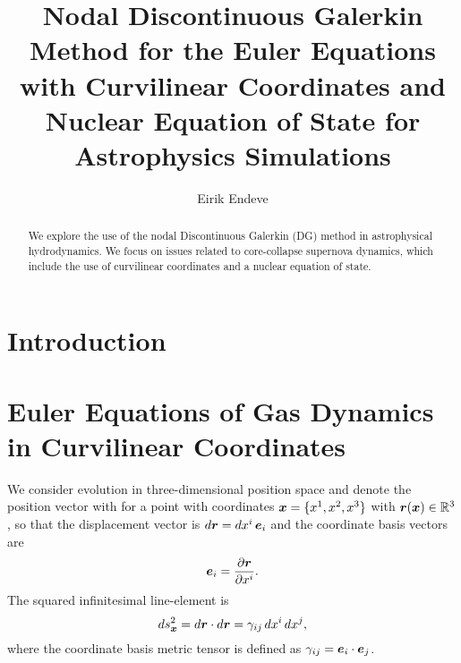 \documentclass[10pt,preprint]{aastex}
\begin{document}
\title{Nodal Discontinuous Galerkin Method for the Euler Equations with Curvilinear Coordinates and Nuclear Equation of State for Astrophysics Simulations}
\author{Eirik Endeve}

\begin{abstract}
We explore the use of the nodal Discontinuous Galerkin (DG) method in astrophysical hydrodynamics.  
We focus on issues related to core-collapse supernova dynamics, which include the use of curvilinear coordinates and a nuclear equation of state.  
\end{abstract}

\section{Introduction}

\section{Euler Equations of Gas Dynamics in Curvilinear Coordinates}

We consider evolution in three-dimensional position space and denote the position vector with for a point with coordinates $\boldsymbol{x}=\{x^{1},x^{2},x^{3}\}$ with $\boldsymbol{r}(\boldsymbol{x})\in\mathbb{R}^{3}$, so that the displacement vector is $d\boldsymbol{r}=dx^{i}\,\boldsymbol{e}_{i}$ and the coordinate basis vectors are
\begin{equation}
  \boldsymbol{e}_{i}=\frac{\partial \boldsymbol{r}}{\partial x^{i}}.  
\end{equation}
The squared infinitesimal line-element is
\begin{equation}
  ds_{\boldsymbol{x}}^{2}=d\boldsymbol{r}\cdot d\boldsymbol{r}=\gamma_{ij}\,dx^{i}\,dx^{j},
\end{equation}
where the coordinate basis metric tensor is defined as $\gamma_{ij}=\boldsymbol{e}_{i}\cdot\boldsymbol{e}_{j}$.  
\end{document}
